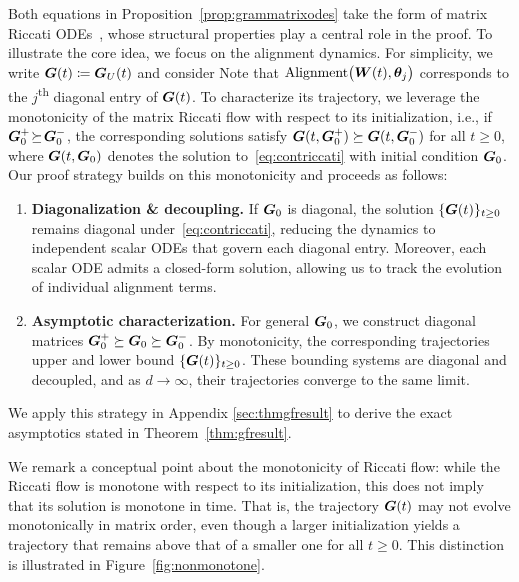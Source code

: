 Both equations in Proposition~\ref{prop:grammatrixodes} take the form of matrix Riccati ODEs~\cite{Bittanti1991TheRE}, whose structural properties play a central role in the proof. To illustrate the core idea, we focus on the alignment dynamics.   For simplicity, we write $\boldsymbol{G}(t) \coloneqq\boldsymbol{G}_{U}(t)$  and consider 
Note that $\mathrm{Alignment}\big(\boldsymbol{W}(t), \boldsymbol{\theta}_j\big)$ corresponds to the $j$\textsuperscript{th} diagonal entry of $\boldsymbol{G}(t)$. To characterize its trajectory, we leverage the monotonicity of the matrix Riccati flow with respect to its initialization, i.e., if $\boldsymbol{G}_0^+ \! \succeq \! \boldsymbol{G}_0^-$,  the corresponding solutions satisfy $\boldsymbol{G}(t, \boldsymbol{G}_0^+) \succeq \boldsymbol{G}(t, \boldsymbol{G}_0^-)$ for all $t \geq 0$, where $\boldsymbol{G}(t, \boldsymbol{G}_0)$ denotes the solution to~\eqref{eq:contriccati} with initial condition $\boldsymbol{G}_0$. Our proof strategy builds on this monotonicity and proceeds as follows:
\begin{enumerate}[leftmargin=*,]
\item \textbf{Diagonalization \& decoupling.} If $\boldsymbol{G}_0$ is diagonal, the solution $\{ \boldsymbol{G}(t) \}_{t \geq 0}$ remains diagonal under~\eqref{eq:contriccati}, reducing the dynamics to independent scalar ODEs that govern each diagonal entry. Moreover, each scalar ODE admits a closed-form solution, allowing us to track the evolution of individual alignment terms. 
\item \textbf{Asymptotic characterization.} For general $\boldsymbol{G}_0$, we construct diagonal matrices $\boldsymbol{G}_0^+ \succeq \boldsymbol{G}_0 \succeq \boldsymbol{G}_0^-$. By monotonicity, the corresponding trajectories upper and lower bound $\{ \boldsymbol{G}(t) \}_{t \geq 0}$. These bounding systems are diagonal and decoupled, and as $d \to \infty$, their trajectories converge to the same limit.  
\end{enumerate}

We apply this strategy in Appendix \ref{sec:thmgfresult} to derive the exact asymptotics stated in Theorem~\ref{thm:gfresult}.


\begin{remark}
We remark a conceptual point about the monotonicity of Riccati flow: {while the Riccati flow is monotone with respect to its initialization, this does not imply that its solution is monotone in time.} That is, the trajectory $\boldsymbol{G}(t)$ may not evolve monotonically in matrix order, even though a larger initialization yields a trajectory that remains above that of a smaller one for all $t \geq 0$. This distinction is illustrated in Figure~\ref{fig:nonmonotone}.
\end{remark}

